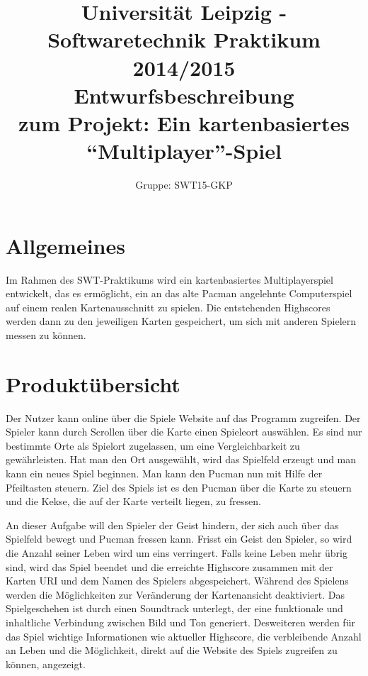 \documentclass[11pt,a4paper]{article}
\author{Gruppe: SWT15-GKP}
\title{Universität Leipzig - Softwaretechnik Praktikum 2014/2015 \\  Entwurfsbeschreibung \\ zum Projekt: Ein kartenbasiertes “Multiplayer”-Spiel}
\begin{document}
\maketitle


\tableofcontents

\clearpage

\section{Allgemeines}
Im Rahmen des SWT-Praktikums wird ein kartenbasiertes Multiplayerspiel entwickelt, das es ermöglicht, ein an das alte Pacman angelehnte Computerspiel auf einem realen Kartenausschnitt zu spielen. Die entstehenden Highscores werden dann zu den jeweiligen Karten gespeichert, um sich mit anderen Spielern messen zu können.


\section{Produktübersicht}
Der Nutzer kann online über die Spiele Website auf das Programm zugreifen.
Der Spieler kann durch Scrollen über die Karte einen Spieleort auswählen. Es sind nur bestimmte Orte als Spielort zugelassen, um eine Vergleichbarkeit zu gewährleisten.
Hat man den Ort ausgewählt, wird das Spielfeld erzeugt und man kann ein neues Spiel beginnen. 
Man kann den Pucman nun mit Hilfe der Pfeiltasten steuern.
Ziel des Spiels ist es den Pucman über die Karte zu steuern und die Kekse, die auf der Karte verteilt liegen, zu fressen. 

An dieser Aufgabe will den Spieler der Geist hindern, der sich auch über das Spielfeld bewegt und Pucman fressen kann. Frisst ein Geist den Spieler, so wird %
die Anzahl seiner Leben wird um eins verringert.
Falls keine Leben mehr übrig sind, wird das Spiel beendet und die erreichte Highscore zusammen mit der Karten URI und dem Namen des Spielers abgespeichert.
Während des Spielens werden die Möglichkeiten zur Veränderung der Kartenansicht deaktiviert. 
Das Spielgeschehen ist durch einen Soundtrack unterlegt, der eine funktionale und inhaltliche Verbindung zwischen Bild und Ton generiert.
Desweiteren werden für das Spiel wichtige Informationen wie aktueller Highscore, die verbleibende Anzahl an Leben und die Möglichkeit, direkt auf die Website des Spiels zugreifen zu können, angezeigt.
\clearpage
\end{document}
